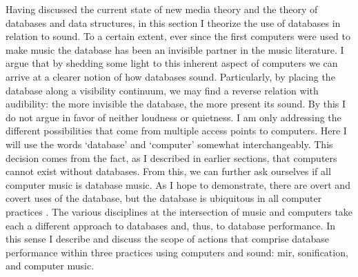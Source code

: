 
Having discussed the current state of new media theory and the theory of databases and data structures, in this section I theorize the use of databases in relation to sound. To a certain extent, ever since the first computers were used to make music the database has been an invisible partner in the music literature. I argue that by shedding some light to this inherent aspect of computers we can arrive at a clearer notion of how databases sound. Particularly, by placing the database along a visibility continuum, we may find a reverse relation with audibility: the more invisible the database, the more present its sound. By this I do not argue in favor of neither loudness or quietness. I am only addressing the different possibilities that come from multiple access points to computers. Here I will use the words `database' and `computer' somewhat interchangeably. This decision comes from the fact, as I described in earlier sections, that computers cannot exist without databases. From this, we can further ask ourselves if all computer music is database music. As I hope to demonstrate, there are overt and covert uses of the database, but the database is ubiquitous in all computer practices . The various disciplines at the intersection of music and computers take each a different approach to databases and, thus, to database performance. In this sense I describe and discuss the scope of actions that comprise database performance within three practices using computers and sound: \gls{mir}, sonification, and computer music.